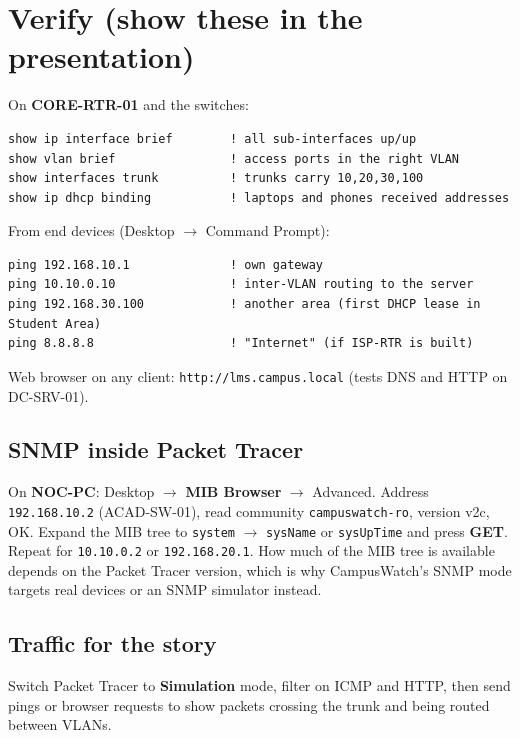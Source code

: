 \documentclass[11pt,a4paper]{article}
\newcommand{\code}[1]{\texttt{#1}}
\begin{document}
\section{Verify (show these in the presentation)}

On \textbf{CORE-RTR-01} and the switches:
\begin{lstlisting}
show ip interface brief        ! all sub-interfaces up/up
show vlan brief                ! access ports in the right VLAN
show interfaces trunk          ! trunks carry 10,20,30,100
show ip dhcp binding           ! laptops and phones received addresses
\end{lstlisting}

From end devices (Desktop $\rightarrow$ Command Prompt):
\begin{lstlisting}
ping 192.168.10.1              ! own gateway
ping 10.10.0.10                ! inter-VLAN routing to the server
ping 192.168.30.100            ! another area (first DHCP lease in Student Area)
ping 8.8.8.8                   ! "Internet" (if ISP-RTR is built)
\end{lstlisting}

Web browser on any client: \code{http://lms.campus.local} (tests DNS and HTTP on DC-SRV-01).

\subsection*{SNMP inside Packet Tracer}
On \textbf{NOC-PC}: Desktop $\rightarrow$ \textbf{MIB Browser} $\rightarrow$ Advanced. Address \code{192.168.10.2} (ACAD-SW-01),
read community \code{campuswatch-ro}, version v2c, OK. Expand the MIB tree to \code{system} $\rightarrow$ \code{sysName} or
\code{sysUpTime} and press \textbf{GET}. Repeat for \code{10.10.0.2} or \code{192.168.20.1}. How much of the MIB tree is available
depends on the Packet Tracer version, which is why CampusWatch's SNMP mode targets real devices or an SNMP simulator instead.

\subsection*{Traffic for the story}
Switch Packet Tracer to \textbf{Simulation} mode, filter on ICMP and HTTP, then send pings or browser requests to show packets
crossing the trunk and being routed between VLANs.

\end{document}

